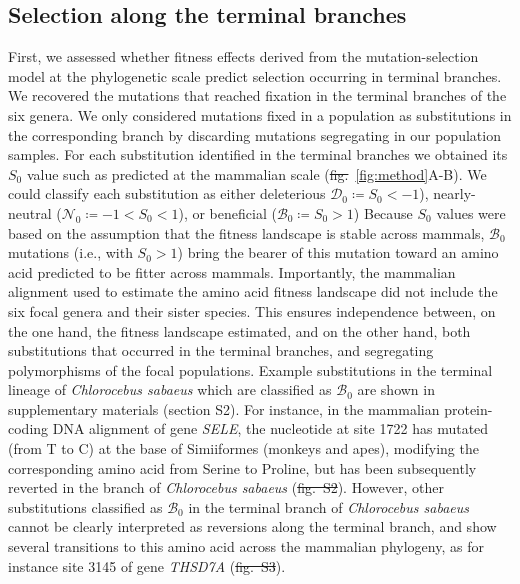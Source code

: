 \documentclass[10pt,letterpaper]{article}
\newcommand{\Sphy}{S_{0}}
\newcommand{\SphyDel}{\mathcal{D}_0}
\newcommand{\SphyNeu}{\mathcal{N}_0}
\newcommand{\SphyBen}{\mathcal{B}_0}
\providecommand{\DIFaddtex}[1]{{\protect\color{blue}\uwave{#1}}} %
\providecommand{\DIFdeltex}[1]{{\protect\color{red}\sout{#1}}}                      %
\providecommand{\DIFaddbegin}{} %
\providecommand{\DIFaddend}{} %
\providecommand{\DIFdelbegin}{} %
\providecommand{\DIFdelend}{} %
\providecommand{\DIFadd}[1]{\texorpdfstring{\DIFaddtex{#1}}{#1}} %
\providecommand{\DIFdel}[1]{\texorpdfstring{\DIFdeltex{#1}}{}} %
\newcommand{\DIFscaledelfig}{0.5}
\newlength{\DIFdelgraphicswidth} %
\newlength{\DIFdelgraphicsheight} %
\newcommand{\DIFaddincludegraphics}[2][]{{\color{blue}\fbox{\DIFOincludegraphics[#1]{#2}}}} %
\newcommand{\DIFdelincludegraphics}[2][]{%
\sbox{\DIFdelgraphicsbox}{\DIFOincludegraphics[#1]{#2}}%
\settoboxwidth{\DIFdelgraphicswidth}{\DIFdelgraphicsbox} %
\settoboxtotalheight{\DIFdelgraphicsheight}{\DIFdelgraphicsbox} %
\scalebox{\DIFscaledelfig}{%
\parbox[b]{\DIFdelgraphicswidth}{\usebox{\DIFdelgraphicsbox}\\[-\baselineskip] \rule{\DIFdelgraphicswidth}{0em}}\llap{\resizebox{\DIFdelgraphicswidth}{\DIFdelgraphicsheight}{%
\setlength{\unitlength}{\DIFdelgraphicswidth}%
\begin{picture}(1,1)%
\thicklines\linethickness{2pt} %
{\color[rgb]{1,0,0}\put(0,0){\framebox(1,1){}}}%
{\color[rgb]{1,0,0}\put(0,0){\line( 1,1){1}}}%
{\color[rgb]{1,0,0}\put(0,1){\line(1,-1){1}}}%
\end{picture}%
}\hspace*{3pt}}} %
} %
\DeclareRobustCommand{\DIFaddbegin}{\DIFOaddbegin \let\includegraphics\DIFaddincludegraphics} %
\DeclareRobustCommand{\DIFaddend}{\DIFOaddend \let\includegraphics\DIFOincludegraphics} %
\DeclareRobustCommand{\DIFdelbegin}{\DIFOdelbegin \let\includegraphics\DIFdelincludegraphics} %
\DeclareRobustCommand{\DIFdelend}{\DIFOaddend \let\includegraphics\DIFOincludegraphics} %
\begin{document}
\subsection*{Selection along the terminal branches}
First, we assessed whether fitness effects derived from the mutation-selection model at the phylogenetic scale predict selection occurring in terminal branches.
We recovered the mutations that reached fixation in the terminal branches of the six genera.
We only considered mutations fixed in a population as substitutions in the corresponding branch by discarding mutations segregating in our population samples.
For each substitution identified in the terminal branches we obtained its $\Sphy$ value such as predicted at the mammalian scale (\DIFdelbegin \DIFdel{fig.}\DIFdelend \DIFaddbegin \DIFadd{Fig}\DIFaddend ~\ref{fig:method}A-B).
We could classify each substitution as either deleterious $\SphyDel \coloneqq \Sphy < -1$), nearly-neutral ($\SphyNeu \coloneqq -1 < \Sphy <1$), or beneficial ($\SphyBen \coloneqq \Sphy > 1$)
Because $\Sphy$ values were based on the assumption that the fitness landscape is stable across mammals, $\SphyBen$ mutations (i.e., with $\Sphy>1$) bring the bearer of this mutation toward an amino acid predicted to be fitter across mammals.
Importantly, the mammalian alignment used to estimate the amino acid fitness landscape did not include the six focal genera and their sister species.
This ensures independence between, on the one hand, the fitness landscape estimated, and on the other hand, both substitutions that occurred in the terminal branches, and segregating polymorphisms of the focal populations.
Example substitutions in the terminal lineage of \textit{Chlorocebus sabaeus} which are classified as $\SphyBen$ are shown in supplementary materials (section S2).
For instance, in the mammalian protein-coding DNA alignment of gene \textit{SELE}, the nucleotide at site 1722 has mutated (from T to C) at the base of Simiiformes (monkeys and apes), modifying the corresponding amino acid from Serine to Proline, but has been subsequently reverted in the branch of \textit{Chlorocebus sabaeus} (\DIFdelbegin \DIFdel{fig.~S2}\DIFdelend \DIFaddbegin {}\DIFaddend ).
However, other substitutions classified as $\SphyBen$ in the terminal branch of \textit{Chlorocebus sabaeus} cannot be clearly interpreted as reversions along the terminal branch, and show several transitions to this amino acid across the mammalian phylogeny, as for instance site 3145 of gene \textit{THSD7A} (\DIFdelbegin \DIFdel{fig.~S3}\DIFdelend \DIFaddbegin {}\DIFaddend ).
\end{document}
